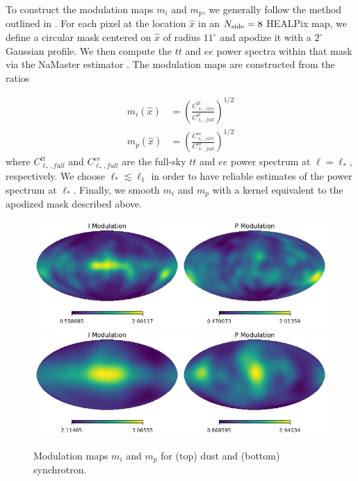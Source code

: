 \documentclass[twocolumn]{aastex631}
\begin{document}
To construct the modulation maps $m_i$ and $m_p$, we generally follow the method outlined in \citet{Thorne:2017}. For each pixel at the location $\hat{x} $ in an $N_{\rm side} = 8$ HEALPix map, we define a circular mask centered on $\hat{x} $ of radius $11^\circ$  and apodize it with a $2^\circ$ Gaussian profile. We then compute the $tt$ and $ee$ power spectra within that mask via the NaMaster estimator \citep{Alonso:2019}. The modulation maps are constructed from the ratios 

\begin{align}
    m_i\left(\hat{x} \right) &= \left(\frac{C^{tt}_{\ell_*,circ}}{C^{tt}_{\ell_*,full}}\right)^{1/2} \\
    m_p\left(\hat{x}\right) &= \left(\frac{C^{ee}_{\ell_*,circ}}{C^{ee}_{\ell_*,full}}\right)^{1/2}
\end{align}
where $C^{tt}_{\ell_*,full}$ and $C^{ee}_{\ell_*,full}$ are the full-sky $tt$ and $ee$ power spectrum at $\ell = \ell_*$, respectively. We choose $\ell_* \lesssim \ell_1$ in order to have reliable estimates of the power spectrum at $\ell_*$. Finally, we smooth $m_i$ and $m_p$ with a kernel equivalent to the apodized mask described above. 
 
 \begin{figure}
     \centering
     \includegraphics[width=2\columnwidth]{figures/mod_dust.png}\\
      \includegraphics[width=2\columnwidth]{figures/mod_synch.png}\\
     \caption{Modulation maps $m_i$ and $m_p$ for (top) dust and  (bottom) synchrotron. }
     \label{fig:modulation_maps}
 \end{figure}
 
\end{document}
